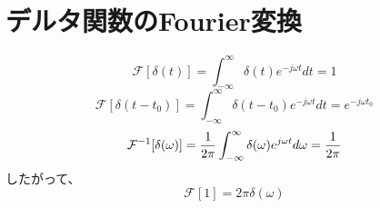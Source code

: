 \documentclass[]{jlreq}
\theoremstyle{definition}
\begin{document}
\section{デルタ関数のFourier変換}
%
\begin{equation}
  \mathcal{F}[\delta (t)] = \int_{-\infty}^{\infty} \delta (t) e^{- j \omega t} dt = 1 
\end{equation}
%
\begin{equation}
  \mathcal{F}[\delta (t - t_0)] = \int_{-\infty}^{\infty} \delta (t - t_0) e^{- j \omega t} dt = e^{-j \omega t_0}
  \label{fd2}
\end{equation}
%
\begin{equation}
  \mathcal{F}^{-1} [\delta(\omega)] = \frac{1}{2\pi}\int_{-\infty}^{\infty} \delta (\omega) e^{j \omega t } d\omega = \frac{1}{2\pi}\notag
\end{equation}
%
したがって、
%
\begin{equation}
  \mathcal{F}[1] = 2\pi\delta(\omega)
\end{equation}
%
\end{document}
